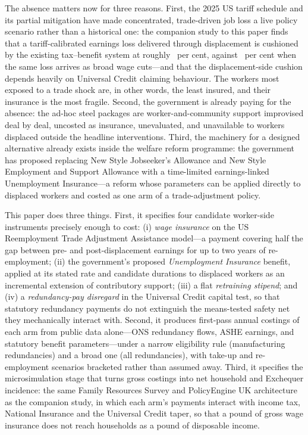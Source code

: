 The absence matters now for three reasons. First, the 2025 US tariff
schedule and its partial mitigation have made concentrated, trade-driven
job loss a live policy scenario rather than a historical one: the
companion study to this paper \citep{ahmadi2026} finds that a
tariff-calibrated earnings loss delivered through displacement is cushioned
by the existing tax--benefit system at roughly
\TaaCompanionDisplacedCushion\ per cent, against
\TaaCompanionWageCushion\ per cent when the same loss arrives as broad
wage cuts---and that the displacement-side cushion depends heavily on
Universal Credit claiming behaviour. The workers most exposed to a trade
shock are, in other words, the least insured, and their insurance is the
most fragile. Second, the government is already paying for the absence:
the ad-hoc steel packages are worker-and-community support improvised
deal by deal, uncosted as insurance, unevaluated, and unavailable to
workers displaced outside the headline interventions. Third, the
machinery for a designed alternative already exists inside the welfare
reform programme: the government has proposed replacing New Style
Jobseeker's Allowance and New Style Employment and Support Allowance with
a time-limited earnings-linked Unemployment Insurance---a reform whose
parameters can be applied directly to displaced workers and costed as one
arm of a trade-adjustment policy.

This paper does three things. First, it specifies four candidate
worker-side instruments precisely enough to cost: (i) \emph{wage
insurance} on the US Reemployment Trade Adjustment Assistance model---a
payment covering half the gap between pre- and post-displacement earnings
for up to two years of re-employment; (ii) the government's proposed
\emph{Unemployment Insurance} benefit, applied at its stated rate and
candidate durations to displaced workers as an incremental extension of
contributory support; (iii) a flat \emph{retraining stipend}; and (iv) a
\emph{redundancy-pay disregard} in the Universal Credit capital test, so
that statutory redundancy payments do not extinguish the means-tested
safety net they mechanically interact with. Second, it produces
first-pass annual costings of each arm from public data alone---ONS
redundancy flows, ASHE earnings, and statutory benefit parameters---under
a narrow eligibility rule (manufacturing redundancies) and a broad one
(all redundancies), with take-up and re-employment scenarios bracketed
rather than assumed away. Third, it specifies the microsimulation stage
that turns gross costings into net household and Exchequer incidence: the
same Family Resources Survey and PolicyEngine UK architecture as the
companion study, in which each arm's payments interact with income tax,
National Insurance and the Universal Credit taper, so that a pound of
gross wage insurance does not reach households as a pound of disposable
income.

